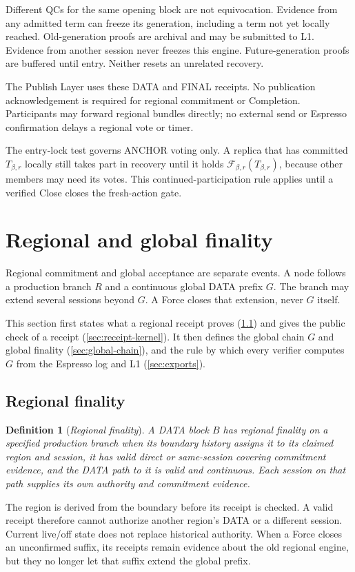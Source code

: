 \documentclass[11pt,a4paper]{article}
\newcommand{\RR}[1]{{\color{rrRed}#1}}
\newcommand{\FC}{\mathcal F}
\newcommand{\defterm}[1]{\textcolor{rrBlue}{\textit{#1}}}
\newtheorem{definition}{Definition}[section]
\begin{document}
Different QCs for the same opening block are not equivocation. Evidence
from any admitted term can freeze its generation, including a term not
yet locally reached. Old-generation proofs are archival and may be
submitted to L1. \RR{Evidence from another session never freezes this
engine.} Future-generation proofs are buffered until entry. Neither
resets an unrelated recovery.

The Publish Layer uses these DATA and FINAL receipts. No publication
acknowledgement is required for regional commitment or Completion.
Participants may forward regional bundles directly; no external send
or Espresso confirmation delays a regional vote or timer.

The entry-lock test governs ANCHOR voting only. A replica that has
committed $T_{\beta,r}$ locally still takes part in recovery until it holds
$\FC_{\beta,r}(T_{\beta,r})$, because other members may need its votes. This continued-participation
rule applies until a verified Close closes the fresh-action gate.

\section{Regional and global finality}
\label{sec:external}
Regional commitment and global acceptance are separate events. A node
follows a production branch $R$ and a continuous global DATA prefix
$G$. The branch may extend several sessions beyond $G$. A Force
closes that extension, never $G$ itself.

This section first states what a regional receipt proves
(\cref{sec:regional-finality}) and gives the public check of a receipt
(\cref{sec:receipt-kernel}). It then defines the global chain $G$ and
global finality (\cref{sec:global-chain}), and the rule by which every
verifier computes $G$ from the Espresso log and L1
(\cref{sec:exports}).

\subsection{Regional finality}
\label{sec:regional-finality}
\begin{definition}[\defterm{Regional finality}]
\label{def:regional-finality}
A DATA block $B$ has regional finality on a specified production branch
when its boundary history assigns it to its claimed region and session,
it has valid direct or same-session covering commitment evidence, and
the DATA path to it is valid and continuous. Each session on that path
supplies its own authority and commitment evidence.
\end{definition}
The region is derived from the boundary before its receipt is checked.
A valid receipt therefore cannot authorize another region's DATA or a
different session. Current live/off state does not replace historical
authority. When a Force closes an unconfirmed suffix, its receipts remain
evidence about the old regional engine, but they no longer let that
suffix extend the global prefix.
\end{document}
